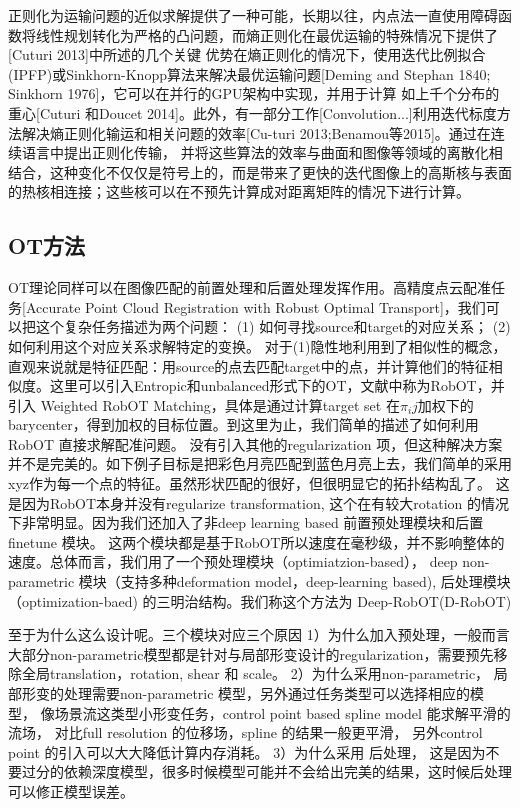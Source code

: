 正则化为运输问题的近似求解提供了一种可能，长期以往，内点法一直使用障碍函数将线性规划转化为严格的凸问题，而熵正则化在最优运输的特殊情况下提供了[Cuturi 2013]中所述的几个关键
优势在熵正则化的情况下，使用迭代比例拟合(IPFP)或Sinkhorn-Knopp算法来解决最优运输问题[Deming and Stephan 1840; Sinkhorn 1976]，它可以在并行的GPU架构中实现，并用于计算
如上千个分布的重心[Cuturi 和Doucet 2014]。此外，有一部分工作[Convolution...]利用迭代标度方法解决熵正则化输运和相关问题的效率[Cu-turi 2013;Benamou等2015]。通过在连续语言中提出正则化传输，
并将这些算法的效率与曲面和图像等领域的离散化相结合，这种变化不仅仅是符号上的，而是带来了更快的迭代图像上的高斯核与表面的热核相连接；这些核可以在不预先计算成对距离矩阵的情况下进行计算。

\subsection{OT方法}

OT理论同样可以在图像匹配的前置处理和后置处理发挥作用。高精度点云配准任务[Accurate Point Cloud Registration with Robust Optimal Transport]，我们可以把这个复杂任务描述为两个问题：
(1) 如何寻找source和target的对应关系；
(2) 如何利用这个对应关系求解特定的变换。
对于(1)隐性地利用到了相似性的概念，直观来说就是特征匹配：用source的点去匹配target中的点，并计算他们的特征相似度。这里可以引入Entropic和unbalanced形式下的OT，文献中称为RobOT，并引入
Weighted RobOT Matching，具体是通过计算target set 在$\pi_ij$加权下的barycenter，得到加权的目标位置。到这里为止，我们简单的描述了如何利用RobOT 直接求解配准问题。
没有引入其他的regularization 项，但这种解决方案并不是完美的。如下例子目标是把彩色月亮匹配到蓝色月亮上去，我们简单的采用xyz作为每一个点的特征。虽然形状匹配的很好，但很明显它的拓扑结构乱了。
这是因为RobOT本身并没有regularize transformation, 这个在有较大rotation 的情况下非常明显。因为我们还加入了非deep learning based 前置预处理模块和后置finetune 模块。
这两个模块都是基于RobOT所以速度在毫秒级，并不影响整体的速度。总体而言，我们用了一个预处理模块（optimiatzion-based）， deep non-parametric 模块（支持多种deformation 
model，deep-learning based), 后处理模块（optimization-baed) 的三明治结构。我们称这个方法为 Deep-RobOT(D-RobOT)

至于为什么这么设计呢。三个模块对应三个原因
1）为什么加入预处理，一般而言大部分non-parametric模型都是针对与局部形变设计的regularization，需要预先移除全局translation，rotation, shear 和 scale。
2）为什么采用non-parametric， 局部形变的处理需要non-parametric 模型，另外通过任务类型可以选择相应的模型， 像场景流这类型小形变任务，control point based spline model 能求解平滑的流场，
对比full resolution 的位移场，spline 的结果一般更平滑， 另外control point 的引入可以大大降低计算内存消耗。
3）为什么采用 后处理， 这是因为不要过分的依赖深度模型，很多时候模型可能并不会给出完美的结果，这时候后处理可以修正模型误差。

